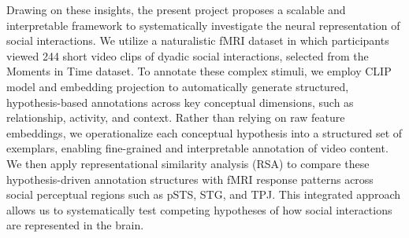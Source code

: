 \documentclass[man]{apa7}
\begin{document}
Drawing on these insights, the present project proposes a scalable and interpretable framework to systematically investigate the neural representation of social interactions. We utilize a naturalistic fMRI dataset in which participants viewed 244 short video clips of dyadic social interactions, selected from the Moments in Time dataset. To annotate these complex stimuli, we employ CLIP model and embedding projection to automatically generate structured, hypothesis-based annotations across key conceptual dimensions, such as relationship, activity, and context. Rather than relying on raw feature embeddings, we operationalize each conceptual hypothesis into a structured set of exemplars, enabling fine-grained and interpretable annotation of video content. We then apply representational similarity analysis (RSA) to compare these hypothesis-driven annotation structures with fMRI response patterns across social perceptual regions such as pSTS, STG, and TPJ. This integrated approach allows us to systematically test competing hypotheses of how social interactions are represented in the brain.
\end{document}
